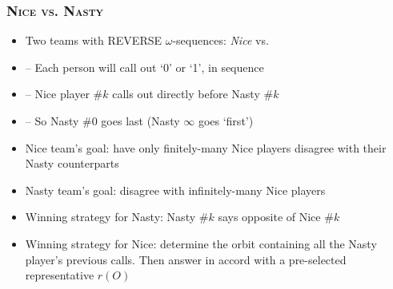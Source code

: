 \begin{frame}
\frametitle{\textsc{Nice vs. Nasty}}

\begin{itemize}[<+->]


\item Two teams with REVERSE $\omega$-sequences: \emph{Nice} vs. 

\item[] -- Each person will call out `0' or `1', in sequence

\item[] -- Nice player $\#k$ calls out directly before Nasty $\#k$

\item[] -- So Nasty $\#0$ goes last (Nasty $\infty$ goes `first')

\item \textcolor{highlightA}{Nice team's goal}: have only finitely-many Nice players disagree with their Nasty counterparts

\item \textcolor{OGlyallpink}{Nasty team's goal}: disagree with infinitely-many Nice players 

\item \textcolor{OGlyallpink}{Winning strategy for Nasty}: Nasty $\#k$ says opposite of Nice $\#k$

\item \textcolor{highlightA}{Winning strategy for Nice}: determine the orbit containing all the Nasty player's previous calls. Then answer in accord with a pre-selected representative $r(O)$



\end{itemize}
\end{frame}
